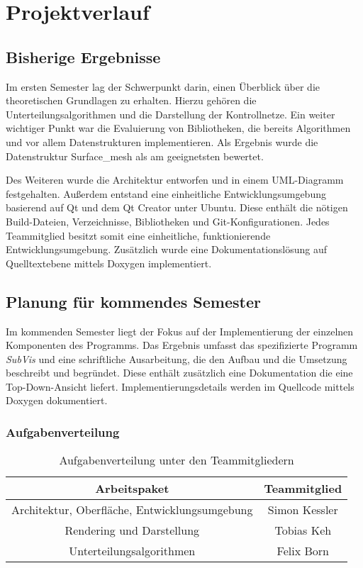 \chapter{Projektverlauf}

\section{Bisherige Ergebnisse}

Im ersten Semester lag der Schwerpunkt darin, einen Überblick über die theoretischen Grundlagen zu erhalten. 
Hierzu gehören die Unterteilungsalgorithmen und die Darstellung der Kontrollnetze.
Ein weiter wichtiger Punkt war die Evaluierung von Bibliotheken, die bereits Algorithmen und vor allem Datenstrukturen implementieren. 
Als Ergebnis wurde die Datenstruktur Surface\_mesh als am geeignetsten bewertet.

Des Weiteren wurde die Architektur entworfen und in einem UML-Diagramm festgehalten.
Außerdem entstand eine einheitliche Entwicklungsumgebung basierend auf Qt und dem Qt Creator unter Ubuntu.
Diese enthält die nötigen Build-Dateien, Verzeichnisse, Bibliotheken und Git-Konfigurationen.
Jedes Teammitglied besitzt somit eine einheitliche, funktionierende Entwicklungsumgebung.
Zusätzlich wurde eine Dokumentationslösung auf Quelltextebene mittels Doxygen implementiert.

\section{Planung für kommendes Semester}

Im kommenden Semester liegt der Fokus auf der Implementierung der einzelnen Komponenten des Programms.
Das Ergebnis umfasst das spezifizierte Programm \emph{SubVis} und eine schriftliche Ausarbeitung, die den Aufbau und die Umsetzung beschreibt und begründet.
Diese enthält zusätzlich eine Dokumentation die eine Top-Down-Ansicht liefert. 
Implementierungsdetails werden im Quellcode mittels Doxygen dokumentiert.

\subsection{Aufgabenverteilung}

\begin{table}
\center
\caption{Aufgabenverteilung unter den Teammitgliedern}
\begin{tabular}{c|c}
Arbeitspaket & Teammitglied\\
\hline
Architektur, Oberfläche, Entwicklungsumgebung & Simon Kessler \\
Rendering und Darstellung & Tobias Keh \\
Unterteilungsalgorithmen & Felix Born \\
\end{tabular}
\label{tab:aufgabenverteilung}
\end{table}

